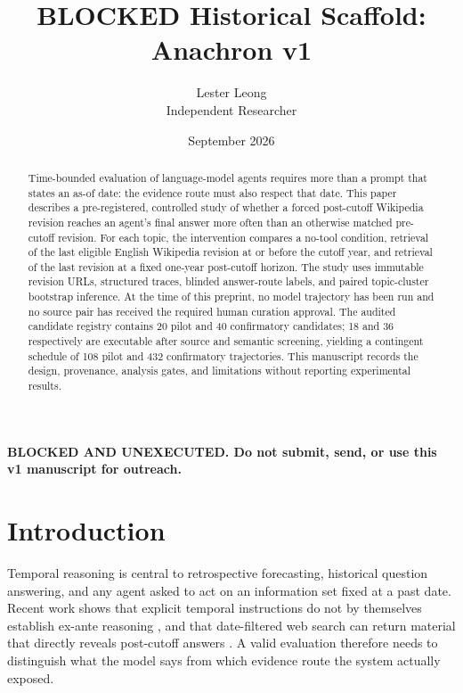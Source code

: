 \documentclass[11pt]{article}
\title{BLOCKED Historical Scaffold: Anachron \routes{} v1}
\author{Lester Leong\\Independent Researcher}
\date{September 2026}
\begin{document}
\maketitle

\begin{center}\textbf{BLOCKED AND UNEXECUTED. Do not submit, send, or use this v1 manuscript for outreach.}\end{center}

\begin{abstract}
Time-bounded evaluation of language-model agents requires more than a prompt that states an as-of date: the evidence route must also respect that date. This paper describes a pre-registered, controlled study of whether a forced post-cutoff Wikipedia revision reaches an agent's final answer more often than an otherwise matched pre-cutoff revision. For each topic, the intervention compares a no-tool condition, retrieval of the last eligible English Wikipedia revision at or before the cutoff year, and retrieval of the last revision at a fixed one-year post-cutoff horizon. The study uses immutable revision URLs, structured traces, blinded answer-route labels, and paired topic-cluster bootstrap inference. At the time of this preprint, no model trajectory has been run and no source pair has received the required human curation approval. The audited candidate registry contains 20 pilot and 40 confirmatory candidates; 18 and 36 respectively are executable after source and semantic screening, yielding a contingent schedule of 108 pilot and 432 confirmatory trajectories. This manuscript records the design, provenance, analysis gates, and limitations without reporting experimental results.
\end{abstract}

\section{Introduction}

Temporal reasoning is central to retrospective forecasting, historical question answering, and any agent asked to act on an information set fixed at a past date. Recent work shows that explicit temporal instructions do not by themselves establish ex-ante reasoning \citep{liu-etal-2026-exante}, and that date-filtered web search can return material that directly reveals post-cutoff answers \citep{el-lahib-etal-2026-temporal}. A valid evaluation therefore needs to distinguish what the model says from which evidence route the system actually exposed.
\end{document}
